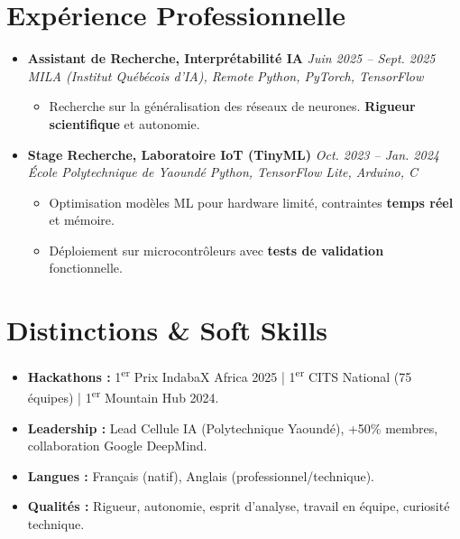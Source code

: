 \documentclass[a4paper,11pt]{article}
\begin{document}
\section{Expérience Professionnelle}
\begin{itemize}[leftmargin=*, label={-}]

\item \textbf{Assistant de Recherche, Interprétabilité IA} \hfill \textit{Juin 2025 -- Sept. 2025} \\
\textit{MILA (Institut Québécois d'IA), Remote} \hfill \textit{Python, PyTorch, TensorFlow}
\vspace{-2pt}
    \begin{itemize}[leftmargin=0.4cm, nosep, label=\tiny$\bullet$]
        \item \small{Recherche sur la généralisation des réseaux de neurones. \textbf{Rigueur scientifique} et autonomie.}
    \end{itemize}
\vspace{3pt}

\item \textbf{Stage Recherche, Laboratoire IoT (TinyML)} \hfill \textit{Oct. 2023 -- Jan. 2024} \\
\textit{École Polytechnique de Yaoundé} \hfill \textit{Python, TensorFlow Lite, Arduino, C}
\vspace{-2pt}
    \begin{itemize}[leftmargin=0.4cm, nosep, label=\tiny$\bullet$]
        \item \small{Optimisation modèles ML pour hardware limité, contraintes \textbf{temps réel} et mémoire.}
        \item \small{Déploiement sur microcontrôleurs avec \textbf{tests de validation} fonctionnelle.}
    \end{itemize}

\end{itemize}

\section{Distinctions \& Soft Skills}
\begin{itemize}[leftmargin=*, label=\tiny$\bullet$, nosep]
    \item \textbf{Hackathons :} 1\textsuperscript{er} Prix IndabaX Africa 2025 | 1\textsuperscript{er} CITS National (75 équipes) | 1\textsuperscript{er} Mountain Hub 2024.
    \item \textbf{Leadership :} Lead Cellule IA (Polytechnique Yaoundé), +50\% membres, collaboration Google DeepMind.
    \item \textbf{Langues :} Français (natif), Anglais (professionnel/technique).
    \item \textbf{Qualités :} Rigueur, autonomie, esprit d'analyse, travail en équipe, curiosité technique.
\end{itemize}
\end{document}
